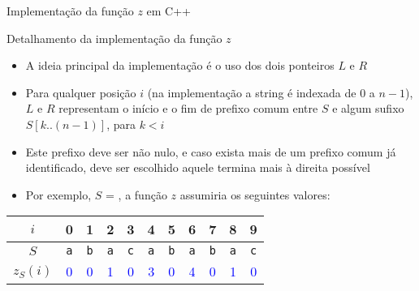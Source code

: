\begin{frame}[fragile]{Implementação da função $z$ em C++}
\end{frame}

\begin{frame}[fragile]{Detalhamento da implementação da função $z$}

    \begin{itemize}
        \item A ideia principal da implementação é o uso dos dois ponteiros $L$ e $R$

        \item Para qualquer posição $i$ (na implementação a string é indexada de $0$ a $n - 1$), 
            $L$ e $R$ representam o início e o fim de prefixo comum 
            entre $S$ e algum sufixo $S[k..(n-1)]$, para $k < i$

        \item Este prefixo deve ser não nulo, e caso exista mais de um prefixo comum já 
            identificado, deve ser escolhido aquele termina mais à direita possível

        \item Por exemplo, $S$ = , a função $z$ assumiria os seguintes
            valores:


    \end{itemize}

    \begin{center}
        \begin{tabular}{c|cccccccccc}
        $i$ & 0 & 1 & 2 & 3 & 4 & 5 & 6 & 7 & 8 & 9 \\
        \hline
        $S$ & \texttt{\textcolor{red!80!black}{a}} & \texttt{\textcolor{red!80!black}{b}} & \texttt{\textcolor{red!80!black}{a}} & \texttt{\textcolor{red!80!black}{c}} & \texttt{\textcolor{red!80!black}{a}} & \texttt{\textcolor{red!80!black}{b}}
& \texttt{\textcolor{red!80!black}{a}} 
& \texttt{\textcolor{red!80!black}{b}}
& \texttt{\textcolor{red!80!black}{a}}
& \texttt{\textcolor{red!80!black}{c}} \\
        $z_S(i)$ & \textcolor{blue}{0} & \textcolor{blue}{0} & \textcolor{blue}{1} & \textcolor{blue}{0} & \textcolor{blue}{3} & \textcolor{blue}{0}
& \textcolor{blue}{4}
& \textcolor{blue}{0}
& \textcolor{blue}{1}
& \textcolor{blue}{0} \\
        \end{tabular}
    \end{center}


\end{frame}

